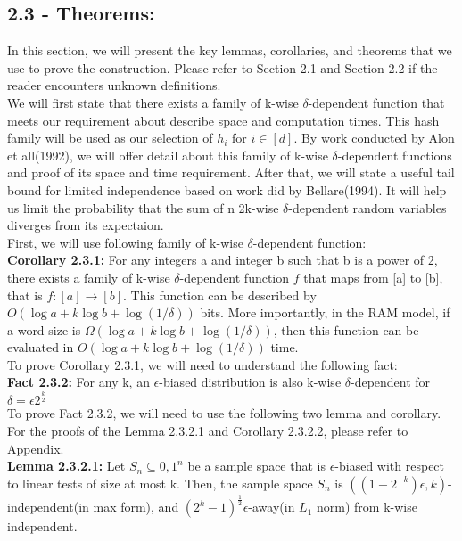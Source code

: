 \documentclass[a4paper, english]{paper}
\begin{document}
	\subsection{2.3 - Theorems:}
\quad	In this section, we will present the key lemmas, corollaries, and theorems that we use to prove the construction. Please refer to Section 2.1 and Section 2.2 if the reader encounters unknown definitions. \\
	\indent We will first state that there exists a family of k-wise $\delta$-dependent function that meets our requirement about describe space and computation times. This hash family will be used as our selection of $h_i$ for $i\in[d]$. By work conducted by Alon et all(1992), we will offer detail about this family of k-wise $\delta$-dependent functions and proof of its space and time requirement. After that, we will state a useful tail bound for limited independence based on work did by Bellare(1994). It will help us limit the probability that the sum of n 2k-wise $\delta$-dependent random variables diverges from its expectaion. \\

 First, we will use following family of k-wise $\delta$-dependent function:\\
	\noindent\textbf{Corollary 2.3.1:} For any integers a and integer b such that b is a power of 2, there exists a family of k-wise $\delta$-dependent function $f$ that maps from [a] to [b], that is $f: [a] \rightarrow [b]$. This function can be described by $O(\log a + k\log b+ \log(1/\delta))$ bits. More importantly, in the RAM model, if a word size is $\Omega(\log a + k\log b+ \log(1/\delta))$, then this function can be evaluated in $O(\log a + k\log b+ \log(1/\delta))$ time. \\

 To prove Corollary 2.3.1, we will need to understand the following fact:\\	
	\noindent\textbf{Fact 2.3.2:} For any k, an $\epsilon$-biased distribution is also k-wise $\delta$-dependent for $\delta=\epsilon2^{\frac k2}$\\
	
 To prove Fact 2.3.2, we will need to use the following two lemma and corollary. For the proofs of the Lemma 2.3.2.1 and Corollary 2.3.2.2, please refer to Appendix. \\
	\noindent\textbf{Lemma 2.3.2.1:} Let $S_n\subseteq{0,1}^n$ be a sample space that is $\epsilon$-biased with respect to linear tests of size at most k. Then, the sample space $S_n$ is $((1-2^{-k})\epsilon,k)$-independent(in max form), and $(2^k-1)^{\frac12}\epsilon$-away(in $L_1$ norm) from k-wise independent.\\
	
\end{document}
